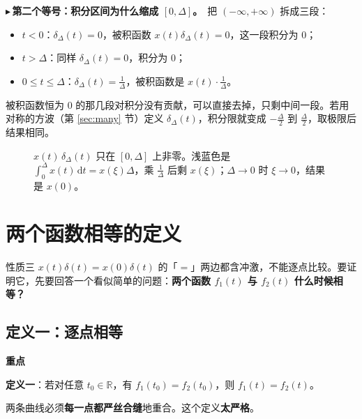 \documentclass[UTF8,a4paper,11pt]{ctexart}
\newenvironment{remember}{\begin{rememberbox}\textbf{重点}\par\smallskip}{\end{rememberbox}}
\newcommand{\taxes}[4][t]{%
  \draw[->] (#2,0) -- (#3,0) node[right,font=\scriptsize] {$#1$};
  \draw[->] (0,-0.3) -- (0,#4);
  \node[anchor=north east,font=\tiny,gray!60!black,inner sep=1pt] at (0,-0.02) {$0$};}
\newcommand{\xt}[2]{\draw (#1,0) -- (#1,-0.1) node[anchor=north,font=\tiny,gray!60!black,fill=white,inner sep=0.6pt] {$#2$};}
\newcommand{\yt}[2]{\draw (0,#1) -- (-0.1,#1) node[anchor=east,font=\tiny,gray!60!black,fill=white,inner sep=0.6pt] {$#2$};}
\newcounter{ex}[section]
\newcommand{\point}[1]{\par\addvspace{1ex}\noindent\textcolor{ptteal}{$\blacktriangleright$\,\textbf{#1}}\ }
\begin{document}
\point{第二个等号：积分区间为什么缩成 $[0,\Delta]$。}把 $(-\infty,+\infty)$ 拆成三段：
\begin{itemize}[nosep]
\item $t<0$：$\delta_\Delta(t)=0$，被积函数 $x(t)\delta_\Delta(t)=0$，这一段积分为 $0$；
\item $t>\Delta$：同样 $\delta_\Delta(t)=0$，积分为 $0$；
\item $0\le t\le\Delta$：$\delta_\Delta(t)=\frac1\Delta$，被积函数是 $x(t)\cdot\frac1\Delta$。
\end{itemize}
被积函数恒为 $0$ 的那几段对积分没有贡献，可以直接去掉，只剩中间一段。若用对称的方波（第 \ref{sec:many} 节）定义 $\delta_\Delta(t)$，积分限就变成 $-\frac\Delta2$ 到 $\frac\Delta2$，取极限后结果相同。

\begin{figure}[H]
\centering
{}
\caption{$x(t)\,\delta_\Delta(t)$ 只在 $[0,\Delta]$ 上非零。浅蓝色是 $\int_0^\Delta x(t)\,\mathrm{d}t=x(\xi)\Delta$，乘 $\frac1\Delta$ 后剩 $x(\xi)$；$\Delta\to0$ 时 $\xi\to0$，结果是 $x(0)$。}
\end{figure}

\section{两个函数相等的定义}\label{sec:equal}
性质三 $x(t)\delta(t)=x(0)\delta(t)$ 的「$=$」两边都含冲激，不能逐点比较。要证明它，先要回答一个看似简单的问题：\textbf{两个函数 $f_1(t)$ 与 $f_2(t)$ 什么时候相等？}

\subsection{定义一：逐点相等}
\begin{remember}
\textbf{定义一}：若对任意 $t_0\in\mathbb{R}$，有 $f_1(t_0)=f_2(t_0)$，则 $f_1(t)=f_2(t)$。
\end{remember}
两条曲线必须\textbf{每一点都严丝合缝}地重合。这个定义\textbf{太严格}。
\end{document}
